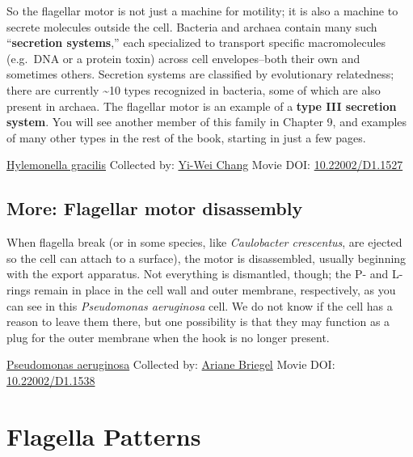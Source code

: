 \documentclass[]{tufte-book}
\begin{document}
So the flagellar motor is not just a machine for motility; it is also a machine to secrete molecules outside the cell. Bacteria and archaea contain many such ``\textbf{secretion systems},'' each specialized to transport specific macromolecules (e.g.~DNA or a protein toxin) across cell envelopes--both their own and sometimes others. Secretion systems are classified by evolutionary relatedness; there are currently \textasciitilde{}10 types recognized in bacteria, some of which are also present in archaea. The flagellar motor is an example of a \textbf{type III secretion system}. You will see another member of this family in Chapter 9, and examples of many other types in the rest of the book, starting in just a few pages.



\hypertarget{htmlwidget-06d616677b8f93943d2b}{}

\label{fig:6-3}\protect\hyperlink{tree}{Hylemonella gracilis} Collected by: \protect\hyperlink{yi-wei_chang}{Yi-Wei Chang} Movie DOI: \href{https://doi.org/10.22002/D1.1527}{10.22002/D1.1527}

\hypertarget{Flagellar_motor_disassembly}{%
\subsection*{More: Flagellar motor disassembly}\label{Flagellar_motor_disassembly}}

When flagella break (or in some species, like \emph{Caulobacter crescentus}, are ejected so the cell can attach to a surface), the motor is disassembled, usually beginning with the export apparatus. Not everything is dismantled, though; the P- and L-rings remain in place in the cell wall and outer membrane, respectively, as you can see in this \emph{Pseudomonas aeruginosa} cell. We do not know if the cell has a reason to leave them there, but one possibility is that they may function as a plug for the outer membrane when the hook is no longer present.



\hypertarget{htmlwidget-cd27744b3f3322b747d7}{}

\label{fig:6-3a}\protect\hyperlink{tree}{Pseudomonas aeruginosa} Collected by: \protect\hyperlink{ariane_briegel}{Ariane Briegel} Movie DOI: \href{https://doi.org/10.22002/D1.1538}{10.22002/D1.1538}

\hypertarget{flagella-patterns}{%
\section{Flagella Patterns}\label{flagella-patterns}}
\end{document}
